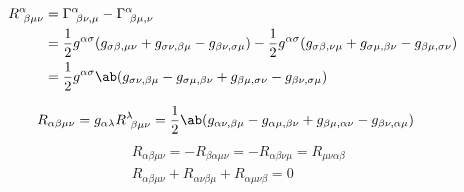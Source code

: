 \documentclass[uplatex,dvipdfmx,a4paper,11pt]{jlreq}
\theoremstyle{definition}
\begin{document}
\begin{align}
  R^\alpha_{\ \beta\mu\nu} & = \Gamma^\alpha_{\ \beta\nu,\mu} - \Gamma^\alpha_{\ \beta\mu,\nu}                                                                                                                                               \\
                           & = \frac{1}{2}g^{\alpha\sigma}(g_{\sigma\beta,\mu\nu} + g_{\sigma\nu,\beta\mu} - g_{\beta\nu,\sigma\mu}) - \frac{1}{2}g^{\alpha\sigma}(g_{\sigma\beta,\nu\mu} + g_{\sigma\mu,\beta\nu} - g_{\beta\mu,\sigma\nu}) \\
                           & = \frac{1}{2}g^{\alpha\sigma}\ab(g_{\sigma\nu,\beta\mu} - g_{\sigma\mu,\beta\nu} + g_{\beta\mu,\sigma\nu} - g_{\beta\nu,\sigma\mu})
\end{align}

\begin{align}
  R_{\alpha\beta\mu\nu} & = g_{\alpha\lambda}R^\lambda_{\ \beta\mu\nu} = \frac{1}{2}\ab(g_{\alpha\nu,\beta\mu} - g_{\alpha\mu,\beta\nu} + g_{\beta\mu,\alpha\nu} - g_{\beta\nu,\alpha\mu})
\end{align}
\begin{align}
   & R_{\alpha\beta\mu\nu} = -R_{\beta\alpha\mu\nu} = -R_{\alpha\beta\nu\mu} = R_{\mu\nu\alpha\beta} \\
   & R_{\alpha\beta\mu\nu} + R_{\alpha\nu\beta\mu} + R_{\alpha\mu\nu\beta} = 0
\end{align}
\end{document}

